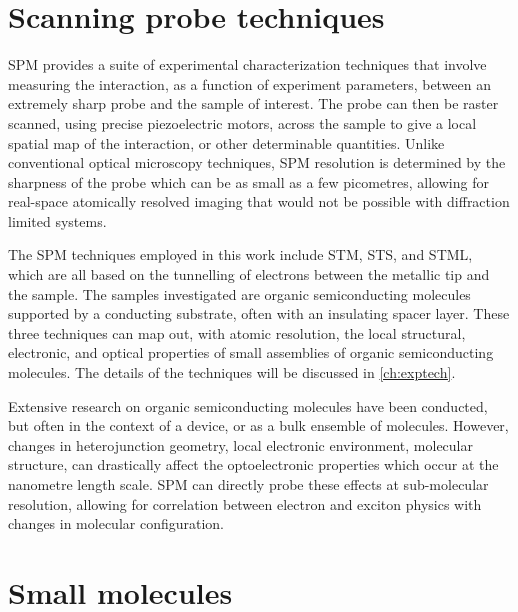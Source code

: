 \section{Scanning probe techniques}


\Acf{SPM} provides a suite of experimental characterization techniques that involve measuring the interaction, as a function of experiment parameters, between an extremely sharp probe and the sample of interest. The probe can then be raster scanned, using precise piezoelectric motors, across the sample to give a local spatial map of the interaction, or other determinable quantities. Unlike conventional optical microscopy techniques, \ac{SPM} resolution is determined by the sharpness of the probe which can be as small as a few picometres, allowing for real-space atomically resolved imaging that would not be possible with diffraction limited systems.

The \ac{SPM} techniques employed in this work include \ac{STM}, \ac{STS}, and \ac{STML}, which are all based on the tunnelling of electrons between the metallic tip and the sample. The samples investigated are organic semiconducting molecules supported by a conducting substrate, often with an insulating spacer layer. These three techniques can map out, with atomic resolution, the local structural, electronic, and optical properties of small assemblies of organic semiconducting molecules. The details of the techniques will be discussed in \autoref{ch:exptech}.

Extensive research on organic semiconducting molecules have been conducted, but often in the context of a device, or as a bulk ensemble of molecules. However, changes in heterojunction geometry, local electronic environment, molecular structure, can drastically affect the optoelectronic properties which occur at the nanometre length scale. \ac{SPM} can directly probe these effects at sub-molecular resolution, allowing for correlation between electron and exciton physics with changes in molecular configuration.

\section{Small molecules }

